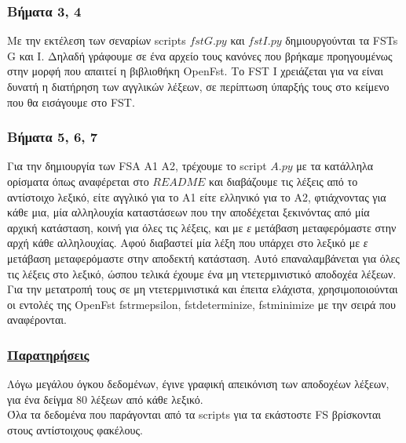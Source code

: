 \documentclass{article}
\begin{document}
\subsubsection*{Βήματα 3, 4}
Με την εκτέλεση των σεναρίων \textlatin{scripts} $fstG.py$ και $fstI.py$ δημιουργούνται τα \textlatin{FSTs G} και \textlatin{I}.
Δηλαδή γράφουμε σε ένα αρχείο τους κανόνες που βρήκαμε προηγουμένως στην μορφή που απαιτεί η βιβλιοθήκη \textlatin{OpenFst}.
Το \textlatin{FST I} χρειάζεται για να είναι δυνατή η διατήρηση των αγγλικών λέξεων, σε περίπτωση ύπαρξής τους στο κείμενο που θα εισάγουμε στο \textlatin{FST}.
\subsubsection*{Βήματα 5, 6, 7}
Για την δημιουργία των \textlatin{FSA A1 A2}, τρέχουμε το \textlatin{script} $A.py$ με τα κατάλληλα ορίσματα όπως αναφέρεται στο $README$ και διαβάζουμε τις λέξεις από το αντίστοιχο λεξικό, είτε αγγλικό για το Α1 είτε ελληνικό για το Α2, φτιάχνοντας για κάθε μια, μία αλληλουχία καταστάσεων που την αποδέχεται ξεκινόντας από μία αρχική κατάσταση, κοινή για όλες τις λέξεις, και με \textit{ε} μετάβαση μεταφερόμαστε στην αρχή κάθε αλληλουχίας. Αφού διαβαστεί μία λέξη που υπάρχει στο λεξικό με \textit{ε} μετάβαση μεταφερόμαστε στην αποδεκτή κατάσταση. Αυτό επαναλαμβάνεται για όλες τις λέξεις στο λεξικό, ώσπου τελικά έχουμε ένα μη ντετερμινιστικό αποδοχέα λέξεων.\\
Για την μετατροπή τους σε μη ντετερμινιστικά και έπειτα ελάχιστα, χρησιμοποιούνται οι εντολές της \textlatin{OpenFst fstrmepsilon, fstdeterminize, fstminimize} με την σειρά που αναφέρονται.
\subsubsection*{\underline{Παρατηρήσεις}}
Λόγω μεγάλου όγκου δεδομένων, έγινε γραφική απεικόνιση των αποδοχέων λέξεων, για ένα δείγμα 80 λέξεων από κάθε λεξικό.\\
Όλα τα δεδομένα που παράγονται από τα \textlatin{scripts} για τα εκάστοστε \textlatin{FS} βρίσκονται στους αντίστοιχους φακέλους.
\end{document}
